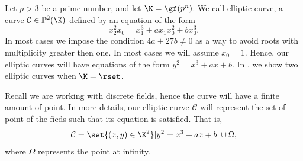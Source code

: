 \documentclass{subfiles}
\begin{document}
    Let \(p > 3\) be a prime number, and let \(\K = \gf(p^{n})\).
        We call elliptic curve, a curve \(\mathcal{C} \in \mathbb{P}^{2}(\K)\) defined by an equation of the form
        \[
            x_{2}^{2}x_{0} = x_{1}^{3} + a x_{1}x_{0}^{2} + bx_{0}^{3}.
        \]
        In most cases we impose the condition \(4a + 27b \ne 0\) 
        as a way to avoid roots with multiplicity greater then one.
        In most cases we will assume \(x_{0} = 1\).
        Hence, our elliptic curves will have equations of the form \(y^{2} = x^{3} + ax + b\).
        In , we show two elliptic curves when \(\K = \rset\).
        

    Recall we are working with discrete fields, hence the curve will have a finite amount of point.
        In more details, our elliptic curve \(\mathcal{C}\) will represent the set of point of 
        the fieds such that its equation is satisfied. That is,
        \[
            \mathcal{C} = \set{(x, y) \in \K^{2}}[y^{2} = x^{3} + ax + b] \cup \Omega,
        \]
        where \(\Omega\) represents the point at infinity.
\end{document}

